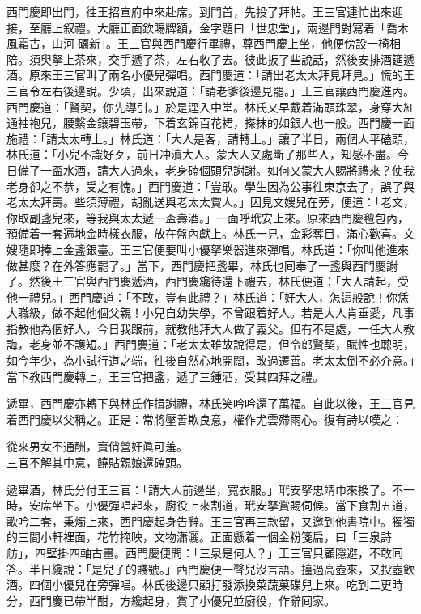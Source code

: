西門慶即出門，徃王招宣府中來赴席。到門首，先投了拜帖。王三官連忙出來迎接，至廳上叙禮。大廳正面欽賜牌額，金字題曰「世忠堂」，兩邊門對寫着「喬木風霜古，山河𥕧礪新」。王三官與西門慶行畢禮，尊西門慶上坐，他便傍設一椅相陪。須臾拏上茶來，交手遞了茶，左右收了去。彼此扳了些說話，然後安排酒筵遞酒。原來王三官叫了兩名小優兒彈唱。西門慶道：「請出老太太拜見拜見。」慌的王三官令左右後邊說。少頃，出來說道：「請老爹後邊見罷。」王三官讓西門慶進內。西門慶道：「賢契，你先導引。」於是逕入中堂。林氏又早戴着滿頭珠翠，身穿大紅通袖袍兒，腰繫金鑲碧玉帶，下着玄錦百花裙，搽抹的如銀人也一般。西門慶一面施禮：「請太太轉上。」林氏道：「大人是客，請轉上。」讓了半日，兩個人平磕頭，林氏道：「小兒不識好歹，前日冲瀆大人。蒙大人又處斷了那些人，知感不盡。今日備了一盃水酒，請大人過來，老身磕個頭兒謝謝。如何又蒙大人賜將禮來？使我老身卻之不恭，受之有愧。」西門慶道：「豈敢。學生因為公事徃東京去了，誤了與老太太拜壽。些須薄禮，胡亂送與老太太賞人。」因見文嫂兒在旁，便道：「老文，你取副盞兒來，等我與太太遞一盃壽酒。」{}一面呼玳安上來。原來西門慶氊包內，預備着一套遍地金時樣衣服，放在盤內獻上。林氏一見，金彩奪目，滿心歡喜。文嫂隨即捧上金盞銀臺。王三官便要叫小優拏樂器進來彈唱。{}林氏道：「你叫他進來做甚麼？在外答應罷了。」當下，西門慶把盞畢，林氏也囘奉了一盞與西門慶謝了。然後王三官與西門慶遞酒，西門慶纔待還下禮去，林氏便道：「大人請起，受他一禮兒。」西門慶道：「不敢，豈有此禮？」林氏道：「好大人，怎這般說！你恁大職級，做不起他個父親！小兒自幼失學，不曾跟着好人。若是大人肯垂愛，凡事指教他為個好人，今日我跟前，就教他拜大人做了義父。{}但有不是處，一任大人教誨，老身並不護短。」西門慶道：「老太太雖故說得是，但令郎賢契，賦性也聰明，如今年少，為小試行道之端，徃後自然心地開闊，改過遷善。老太太倒不必介意。」{}當下教西門慶轉上，王三官把盞，遞了三鍾酒，受其四拜之禮。

遞畢，西門慶亦轉下與林氏作揖謝禮，林氏笑吟吟還了萬福。自此以後，王三官見着西門慶以父稱之。正是：常將壓善欺良意，權作尤雲殢雨心。復有詩以嘆之：

\begin{myquote}
從來男女不通酬，賣俏營奸眞可羞。\\三官不解其中意，饒貼親娘還磕頭。
\end{myquote}

遞畢酒，林氏分付王三官：「請大人前邊坐，寬衣服。」玳安拏忠靖巾來換了。不一時，安席坐下。小優彈唱起來，廚役上來割道，玳安拏賞賜伺候。當下食割五道，歌吟二套，秉燭上來，西門慶起身告辭。王三官再三款留，又邀到他書院中。獨獨的三間小軒裡面，花竹掩映，文物瀟灑。正面懸着一個金粉箋扁，曰「三泉詩舫」，四壁掛四軸古畫。西門慶便問：「三泉是何人？」王三官只顧隱避，不敢囘答。{}半日纔說：「是兒子的賤號。」西門慶便一聲兒沒言語。擡過高壺來，又投壺飲酒。四個小優兒在旁彈唱。林氏後邊只顧打發添換菜蔬菓碟兒上來。吃到二更時分，西門慶已帶半酣，方纔起身，賞了小優兒並廚役，作辭囘家。

